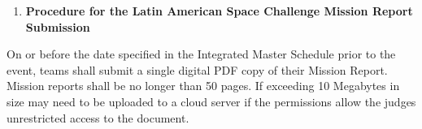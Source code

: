 \begin{enumerate}
\def\labelenumi{\arabic{enumi}.}
\setcounter{enumi}{1}
\item
  \textbf{Procedure for the Latin American Space Challenge Mission
  Report Submission}
\end{enumerate}

On or before the date specified in the Integrated Master Schedule prior
to the event, teams shall submit a single digital PDF copy of their
Mission Report. Mission reports shall be no longer than 50 pages. If
exceeding 10 Megabytes in size may need to be uploaded to a cloud server
if the permissions allow the judges unrestricted access to the document.
